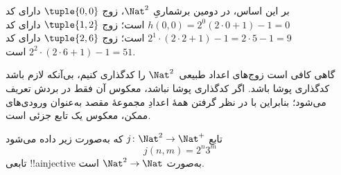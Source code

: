 \documentclass[../../../include/open-logic-section]{subfiles}
\begin{document}
\begin{explain}
بر این اساس، در دومین برشماریِ $\Nat^2$، زوج $\tuple{0,0}$ دارای کد
$h(0,0) = 2^0(2\cdot 0+1) - 1 = 0$ است؛ زوج $\tuple{1,2}$ دارای کد
$2^{1} \cdot (2 \cdot 2 + 1) - 1 = 2
\cdot 5 - 1 = 9$ است؛ زوج $\tuple{2,6}$ دارای کد $2^{2} \cdot (2
\cdot 6 + 1) - 1 = 51$ است.
\end{explain}

گاهی کافی است زوج‌های اعداد طبیعی~$\Nat^2$ را کدگذاری کنیم، بی‌آنکه
لازم باشد کدگذاری پوشا باشد. اگر کدگذاری پوشا نباشد، معکوس آن فقط در بردش
تعریف می‌شود؛ بنابراین با در نظر گرفتن همهٔ اعدادِ مجموعهٔ مقصد به‌عنوان
ورودی‌های ممکن، معکوس یک تابع جزئی است.

\begin{ex}
تابع $j\colon \Nat^2 \to \Nat^+$ که به‌صورت زیر داده می‌شود
\[
j(n,m) = 2^n3^m
\]
تابعی !!a{injective} به‌صورت $\Nat^2 \to \Nat$ است.
\end{ex}
\end{document}
